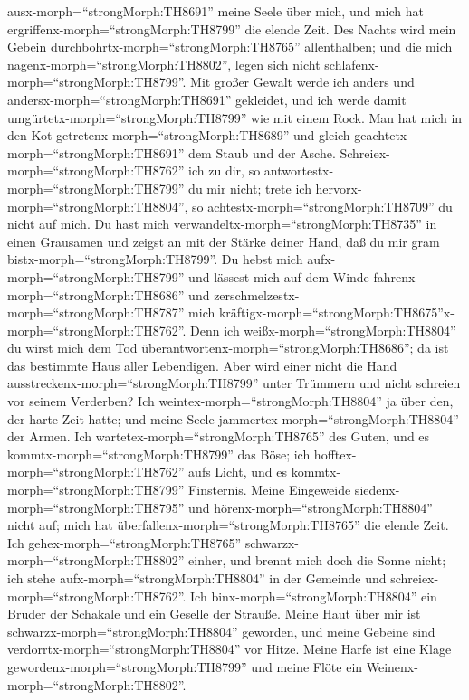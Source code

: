 ausx-morph=``strongMorph:TH8691'' meine Seele über mich, und mich hat
ergriffenx-morph=``strongMorph:TH8799'' die elende Zeit. 
Des Nachts wird mein Gebein durchbohrtx-morph=``strongMorph:TH8765''
allenthalben; und die mich nagenx-morph=``strongMorph:TH8802'', legen
sich nicht schlafenx-morph=``strongMorph:TH8799''.  Mit
großer Gewalt werde ich anders und andersx-morph=``strongMorph:TH8691''
gekleidet, und ich werde damit umgürtetx-morph=``strongMorph:TH8799''
wie mit einem Rock.  Man hat mich in den Kot
getretenx-morph=``strongMorph:TH8689'' und gleich
geachtetx-morph=``strongMorph:TH8691'' dem Staub und der Asche.
 Schreiex-morph=``strongMorph:TH8762'' ich zu dir, so
antwortestx-morph=``strongMorph:TH8799'' du mir nicht; trete ich
hervorx-morph=``strongMorph:TH8804'', so
achtestx-morph=``strongMorph:TH8709'' du nicht auf mich. 
Du hast mich verwandeltx-morph=``strongMorph:TH8735'' in einen Grausamen
und zeigst an mit der Stärke deiner Hand, daß du mir gram
bistx-morph=``strongMorph:TH8799''.  Du hebst mich
aufx-morph=``strongMorph:TH8799'' und lässest mich auf dem Winde
fahrenx-morph=``strongMorph:TH8686'' und
zerschmelzestx-morph=``strongMorph:TH8787'' mich
kräftigx-morph=``strongMorph:TH8675''x-morph=``strongMorph:TH8762''.
 Denn ich weißx-morph=``strongMorph:TH8804'' du wirst mich
dem Tod überantwortenx-morph=``strongMorph:TH8686''; da ist das
bestimmte Haus aller Lebendigen.  Aber wird einer nicht die
Hand ausstreckenx-morph=``strongMorph:TH8799'' unter Trümmern und nicht
schreien vor seinem Verderben?  Ich
weintex-morph=``strongMorph:TH8804'' ja über den, der harte Zeit hatte;
und meine Seele jammertex-morph=``strongMorph:TH8804'' der Armen.
 Ich wartetex-morph=``strongMorph:TH8765'' des Guten, und
es kommtx-morph=``strongMorph:TH8799'' das Böse; ich
hofftex-morph=``strongMorph:TH8762'' aufs Licht, und es
kommtx-morph=``strongMorph:TH8799'' Finsternis.  Meine
Eingeweide siedenx-morph=``strongMorph:TH8795'' und
hörenx-morph=``strongMorph:TH8804'' nicht auf; mich hat
überfallenx-morph=``strongMorph:TH8765'' die elende Zeit. 
Ich gehex-morph=``strongMorph:TH8765''
schwarzx-morph=``strongMorph:TH8802'' einher, und brennt mich doch die
Sonne nicht; ich stehe aufx-morph=``strongMorph:TH8804'' in der Gemeinde
und schreiex-morph=``strongMorph:TH8762''.  Ich
binx-morph=``strongMorph:TH8804'' ein Bruder der Schakale und ein
Geselle der Strauße.  Meine Haut über mir ist
schwarzx-morph=``strongMorph:TH8804'' geworden, und meine Gebeine sind
verdorrtx-morph=``strongMorph:TH8804'' vor Hitze.  Meine
Harfe ist eine Klage gewordenx-morph=``strongMorph:TH8799'' und meine
Flöte ein Weinenx-morph=``strongMorph:TH8802''.

